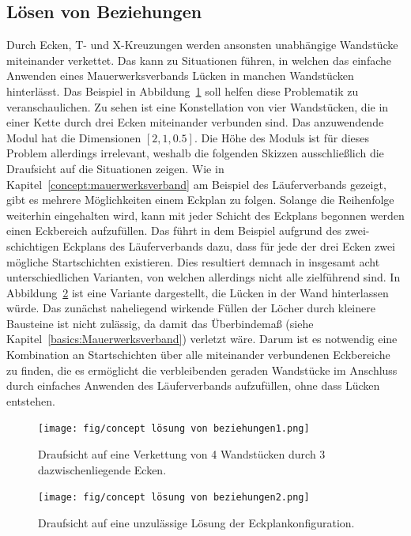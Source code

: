 \subsection{Lösen von Beziehungen}\label{concept:solving_beziehungen}
Durch Ecken, T- und X-Kreuzungen werden ansonsten unabhängige Wandstücke miteinander verkettet.
Das kann zu Situationen führen, in welchen das einfache Anwenden eines Mauerwerksverbands Lücken in manchen Wandstücken hinterlässt.
Das Beispiel in Abbildung~\ref{fig:concept:loesen_von_beziehungen1} soll helfen diese Problematik zu veranschaulichen.
Zu sehen ist eine Konstellation von vier Wandstücken, die in einer Kette durch drei Ecken miteinander verbunden sind.
Das anzuwendende Modul hat die Dimensionen \([2, 1, 0.5]\). 
Die Höhe des Moduls ist für dieses Problem allerdings irrelevant, weshalb die folgenden Skizzen ausschließlich die Draufsicht auf die Situationen zeigen.
Wie in Kapitel~\ref{concept:mauerwerksverband} am Beispiel des Läuferverbands gezeigt, gibt es mehrere Möglichkeiten einem Eckplan zu folgen.
Solange die Reihenfolge weiterhin eingehalten wird, kann mit jeder Schicht des Eckplans begonnen werden einen Eckbereich aufzufüllen.
Das führt in dem Beispiel aufgrund des zwei-schichtigen Eckplans des Läuferverbands dazu, dass für jede der drei Ecken zwei mögliche Startschichten existieren.
Dies resultiert demnach in insgesamt acht unterschiedlichen Varianten, von welchen allerdings nicht alle zielführend sind.
In Abbildung~\ref{fig:concept:loesen_von_beziehungen2} ist eine Variante dargestellt, die Lücken in der Wand hinterlassen würde.
Das zunächst naheliegend wirkende Füllen der Löcher durch kleinere Bausteine ist nicht zulässig, da damit das Überbindemaß (siehe Kapitel~\ref{basics:Mauerwerksverband}) verletzt wäre.
Darum ist es notwendig eine Kombination an Startschichten über alle miteinander verbundenen Eckbereiche zu finden, die es ermöglicht die verbleibenden geraden Wandstücke im Anschluss durch einfaches Anwenden des Läuferverbands aufzufüllen, ohne dass Lücken entstehen.

\begin{figure}[]
    \centering
    \texttt{[image: fig/concept lösung von beziehungen1.png]}
    \caption{Draufsicht auf eine Verkettung von 4 Wandstücken durch 3 dazwischenliegende Ecken.}\label{fig:concept:loesen_von_beziehungen1}
\end{figure}

\begin{figure}[]
    \centering
    \texttt{[image: fig/concept lösung von beziehungen2.png]}
    \caption{Draufsicht auf eine unzulässige Lösung der Eckplankonfiguration.}\label{fig:concept:loesen_von_beziehungen2}
\end{figure}


